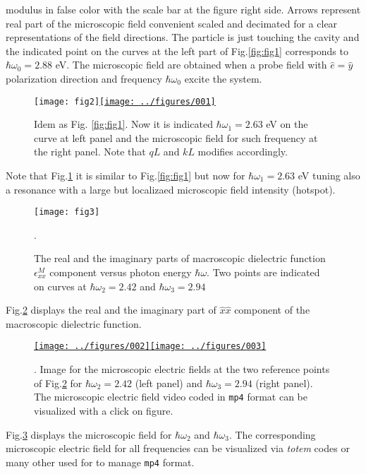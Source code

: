 \documentclass[12pt]{report}
\begin{document}
modulus in false color with the scale bar at the figure right
side. Arrows represent real part of the microscopic field convenient
scaled and decimated for a clear representations of the field
directions. The particle is just touching the cavity and the indicated
point on the curves at the left part of Fig.\ref{fig:fig1} corresponds
to $\hbar\omega_0=2.88$ eV. The microscopic field are obtained when a
probe field with $\hat e =\hat y$ polarization direction and frequency
$\hbar\omega_0$ excite the system.
\begin{figure}
  \begin{center}
    \texttt{[image: fig2]}\href{run:totem
      una\_L\_50\_d\_0\_dir\_0.mp4}{\texttt{[image: ../figures/001]}}
    \caption{\label{fig:fig2} Idem as Fig. \ref{fig:fig1}. Now it is
      indicated $\hbar\omega_1=2.63$ eV on the curve at left panel and
      the microscopic field for such frequency at the right
      panel. Note that $qL$ and $kL$ modifies accordingly.}
  \end{center}
\end{figure}
Note that Fig.\ref{fig:fig2} it is similar to Fig.\ref{fig:fig1} but
now for $\hbar\omega_1=2.63$ eV tuning also a resonance with a large
but localizaed microscopic field intensity (hotspot).
\begin{figure}[htb]
  \begin{center}
      \texttt{[image: fig3]}
    \caption{\label{fig:fig3} The real and the imaginary parts of
      macroscopic dielectric function $\epsilon^M_{xx}$ component
      versus photon energy $\hbar\omega$. Two points are indicated on
      curves at $\hbar\omega_2=2.42$ and $\hbar\omega_3=2.94$}.
  \end{center}
\end{figure}
Fig.\ref{fig:fig3} displays the real and the imaginary part of $\hat
x\hat x$ component of the macroscopic dielectric function.
\begin{figure}[htb]
  \begin{center}
    \href{run:totem una\_d\_0\_dir\_m90.mp4}{%
      \texttt{[image: ../figures/002]}\texttt{[image: ../figures/003]}}
    \caption{\label{fig:fig4}. Image for the microscopic electric
      fields at the two reference points of Fig.\ref{fig:fig3} for
      $\hbar\omega_2=2.42$ (left panel) and $\hbar\omega_3=2.94$
      (right panel). The microscopic electric field video coded in
      {\tt mp4} format can be visualized with a click on figure.}
  \end{center}
\end{figure}
Fig.\ref{fig:fig4} displays the microscopic field for $\hbar\omega_2$
and $\hbar\omega_3$.  The corresponding microscopic electric field for
all frequencies can be visualized via {\em totem} codes or many other
used for to manage {\tt mp4} format.


\end{document}

